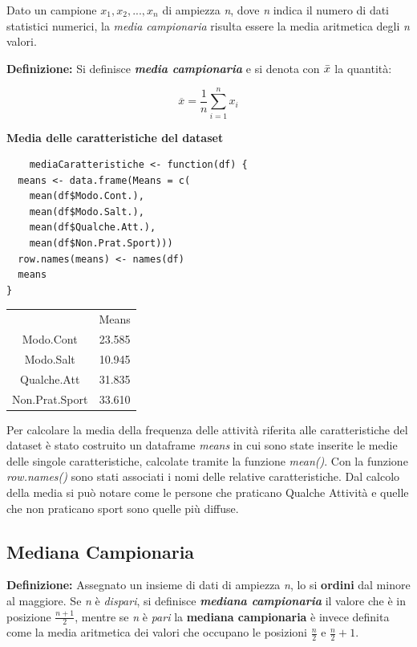 Dato un campione \textit{$x_1, x_2,...,x_n$} di ampiezza \textit{n}, dove \textit{n} indica il numero di dati statistici numerici, la \textit{media campionaria} risulta essere la media aritmetica degli \textit{n} valori.

\noindent \textbf{Definizione:} Si definisce \textbf{\textit{media campionaria}} e si denota con $\Bar{x}$ la quantità:

\[\overline{x} = \frac{1}{n} \sum_{i=1}^n x_i \]

\noindent \textbf{Media delle caratteristiche del dataset}

\vspace{5mm}
\begin{lstlisting}
    mediaCaratteristiche <- function(df) {
  means <- data.frame(Means = c(
    mean(df$Modo.Cont.),
    mean(df$Modo.Salt.),
    mean(df$Qualche.Att.),
    mean(df$Non.Prat.Sport)))
  row.names(means) <- names(df)
  means
}
\end{lstlisting}

\vspace{5mm}
\begin{tabular}{ c c}
  & Means\\
 Modo.Cont & 23.585\\ 
 Modo.Salt & 10.945\\
 Qualche.Att & 31.835\\ 
 Non.Prat.Sport & 33.610\\ 
\end{tabular}
\vspace{5mm}

Per calcolare la media della frequenza delle attività riferita alle caratteristiche del dataset è stato costruito un dataframe \textit{means} in cui sono state inserite le medie delle singole caratteristiche, calcolate tramite la funzione \textit{mean()}. Con la funzione \textit{row.names()} sono stati associati i nomi delle relative caratteristiche. Dal calcolo della media si può notare come le persone che praticano Qualche Attività e quelle che non praticano sport sono quelle più diffuse.

\subsection{Mediana Campionaria}\label{cap3.1.2}

\noindent \textbf{Definizione:} Assegnato un insieme di dati di ampiezza \textit{n}, lo si \textbf{ordini} dal minore al maggiore. Se \textit{n} è \textit{dispari}, si definisce \textbf{\textit{mediana campionaria}} il valore che è in posizione $\frac{n+1}{2}$, mentre se \textit{n} è \textit{pari} la \textbf{mediana campionaria} è invece definita come la media aritmetica dei valori che occupano le posizioni $\frac{n}{2}$ e $\frac{n}{2}+1$.

